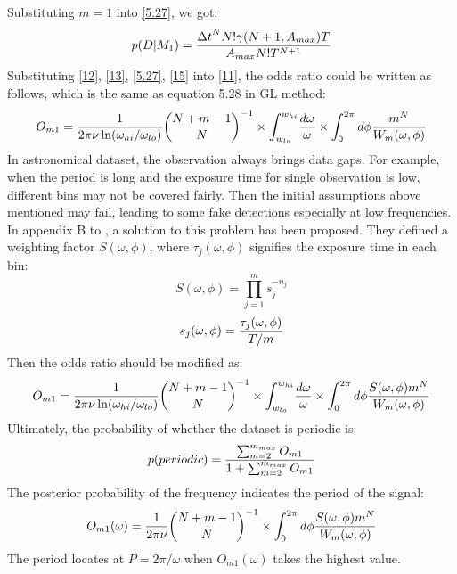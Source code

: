 \documentclass[fleqn,usenatbib]{mnras}
\begin{document}
Substituting $m=1$ into \ref{5.27}, we got:
\begin{equation}\label{15}
p(D|M_1)={{{\Delta t}^N N!\gamma(N+1,A_{max})T}\over {A_{max}N!T^{N+1}}}
\end{equation}
Substituting \ref{12}, \ref{13}, \ref{5.27}, \ref{15} into \ref{11}, the odds ratio could be written as follows, which is the same as equation 5.28 in GL method:
\begin{equation}\label{A16}
O_{m1}={1\over{2\pi \nu \ln(\omega_{hi}/\omega_{lo})}} {{N+m-1}	\choose N}^{-1}\times {\int_{w_{lo}}^{w_{hi}}}{{d\omega}\over{\omega}}\times {\int_0^{2\pi}d\phi{m^N\over W_m(\omega,\phi)}} 
\end{equation}
In astronomical dataset, the observation always brings data gaps. For example, when the period is long and the exposure time for single observation is low, different bins may not be covered fairly. Then the initial assumptions above mentioned may fail, leading to some fake detections especially at low frequencies. In appendix B to \citep{1992ApJ...398..146G}, a solution to this problem has been proposed. They defined a weighting factor $S(\omega,\phi)$, where ${\tau_{j}(\omega,\phi)}$ signifies the exposure time in each bin:
\begin{equation}\label{A17}
S(\omega,\phi)={\prod_{j=1}^m s_j^{-n_j}}
\end{equation}
\begin{equation}
s_j(\omega,\phi)={{\tau_{j}(\omega,\phi)}\over {T/m}}
\end{equation}
Then the odds ratio should be modified as:
\begin{equation}\label{A19}
O_{m1}={1\over{2\pi \nu \ln(\omega_{hi}/\omega_{lo})}} {{N+m-1}	\choose N}^{-1}\times {\int_{w_{lo}}^{w_{hi}}}{{d\omega}\over{\omega}}\times {\int_0^{2\pi}d\phi{S(\omega,\phi)m^N\over W_m(\omega,\phi)}} 
\end{equation}
Ultimately, the probability of whether the dataset is periodic is:
\begin{equation}\label{A20}
p(periodic)={{\sum_{m=2}^{m_{max}} O_{m1}}\over {1+\sum_{m=2}^{m_{max}} O_{m1}}}
\end{equation}
The posterior probability of the frequency indicates the period of the signal:
\begin{equation}\label{A21}
O_{m1}(\omega)={1\over{2\pi \nu}} {{N+m-1}	\choose N}^{-1} \times {\int_0^{2\pi}d\phi{S(\omega,\phi)m^N\over W_m(\omega,\phi)}} 
\end{equation}
The period locates at $P=2\pi /\omega $ when $O_{m1}(\omega)$ takes the highest value.
\end{document}
